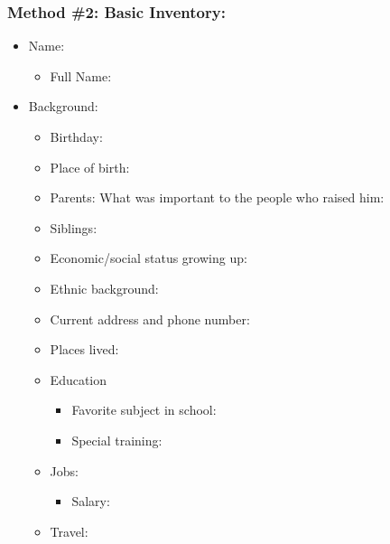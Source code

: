 \documentclass[openleft,oneside,showtrims]{memoir}
\begin{document}
\subsubsection*{Method \#2: Basic Inventory:}
\label{sec:orga143033}
\begin{itemize}
\item Name:
\label{sec:orgb0defe9}

\begin{itemize}
\item Full Name:
\end{itemize}

\item Background:
\label{sec:org03c2501}

\begin{itemize}
\item Birthday:

\item Place of birth:

\item Parents:	What was important to the people who raised him:

\item Siblings:

\item Economic/social status growing up:

\item Ethnic background:

\item Current address and phone number:

\item Places lived:
\end{itemize}

\begin{itemize}
\item Education
\label{sec:orgb29936b}

\begin{itemize}
\item Favorite subject in school:

\item Special training:
\end{itemize}

\item Jobs:
\label{sec:org5d93ab6}

\begin{itemize}
\item Salary:
\end{itemize}

\item Travel:
\label{sec:orga800d10}


\end{itemize}
\end{itemize}
\end{document}
